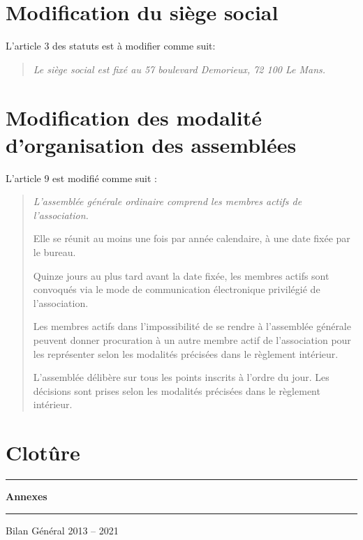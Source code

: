 \documentclass[11pt]{article}
\begin{document}
\setcounter{section}{1}
\section{Modification du siège social}

L'article 3 des statuts est à modifier comme suit:

\begin{quote}
\itshape
Le siège social est fixé au 57 boulevard Demorieux, 72 100 Le Mans.
\end{quote}

\section{Modification des modalité d'organisation des assemblées}

L'article 9 est modifié comme suit :

\begin{quote}
\itshape
L’assemblée générale ordinaire comprend les membres actifs de l’association.

Elle se réunit au moins une fois par année calendaire, à une date fixée par le bureau.

Quinze jours au plus tard avant la date fixée, les membres actifs sont convoqués via le mode de communication électronique privilégié de l'association.

Les membres actifs dans l’impossibilité de se rendre à l’assemblée générale peuvent donner procuration à un autre membre actif de l’association pour les représenter selon les modalités précisées dans le règlement intérieur.

L’assemblée délibère sur tous les points inscrits à l’ordre du jour. Les décisions sont prises selon les
modalités précisées dans le règlement intérieur.
\end{quote}

\section*{Clotûre}

\newpage

\clearpage
\thispagestyle{empty}
\vspace*{\fill}
\begin{center}
\hrule
\vspace{.3cm}
\Huge\bfseries Annexes
\vspace{.3cm}
\hrule
\vspace{2cm}
\Large
\noindent Bilan Général 2013 -- 2021
\end{center}
\vspace*{\fill}


\end{document}
